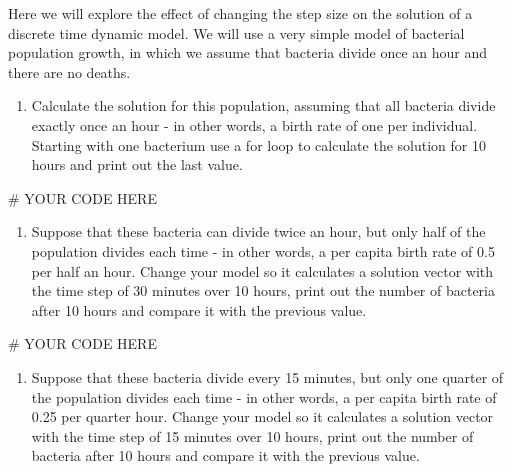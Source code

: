 \documentclass[
  letterpaper,
  DIV=11,
  numbers=noendperiod]{scrreprt}
\newenvironment{Shaded}{\begin{snugshade}}{\end{snugshade}}
\newcommand{\CommentTok}[1]{\textcolor[rgb]{0.37,0.37,0.37}{#1}}
\providecommand{\tightlist}{%
  \setlength{\itemsep}{0pt}\setlength{\parskip}{0pt}}\usepackage{longtable,booktabs,array}
\begin{document}
Here we will explore the effect of changing the step size on the
solution of a discrete time dynamic model. We will use a very simple
model of bacterial population growth, in which we assume that bacteria
divide once an hour and there are no deaths.

\begin{enumerate}
\def\labelenumi{\arabic{enumi}.}
\tightlist
\item
  Calculate the solution for this population, assuming that all bacteria
  divide exactly once an hour - in other words, a birth rate of one per
  individual. Starting with one bacterium use a for loop to calculate
  the solution for 10 hours and print out the last value.
\end{enumerate}

\begin{Shaded}
\begin{Highlighting}[]
\CommentTok{\# YOUR CODE HERE}
\end{Highlighting}
\end{Shaded}

\begin{enumerate}
\def\labelenumi{\arabic{enumi}.}
\setcounter{enumi}{1}
\tightlist
\item
  Suppose that these bacteria can divide twice an hour, but only half of
  the population divides each time - in other words, a per capita birth
  rate of 0.5 per half an hour. Change your model so it calculates a
  solution vector with the time step of 30 minutes over 10 hours, print
  out the number of bacteria after 10 hours and compare it with the
  previous value.
\end{enumerate}

\begin{Shaded}
\begin{Highlighting}[]
\CommentTok{\# YOUR CODE HERE}
\end{Highlighting}
\end{Shaded}

\begin{enumerate}
\def\labelenumi{\arabic{enumi}.}
\setcounter{enumi}{2}
\tightlist
\item
  Suppose that these bacteria divide every 15 minutes, but only one
  quarter of the population divides each time - in other words, a per
  capita birth rate of 0.25 per quarter hour. Change your model so it
  calculates a solution vector with the time step of 15 minutes over 10
  hours, print out the number of bacteria after 10 hours and compare it
  with the previous value.
\end{enumerate}
\end{document}

